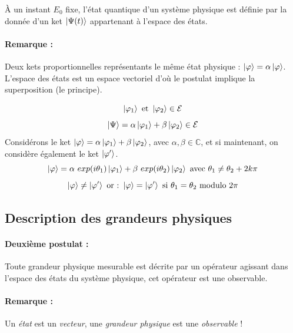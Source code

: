 \documentclass[12pt,a4paper,titlepage]{book}
\begin{document}
À un instant $E_0$ fixe, l'état quantique d'un système physique est définie par la donnée d'un ket $\ket{\Psi (t)}$ appartenant à l'espace des états.

\paragraph*{Remarque :}

Deux kets proportionnelles représentants le même état physique : $\ket \varphi = \alpha \ket \varphi$. L'espace des états est un espace vectoriel d'où le postulat implique la superposition (le principe).

\begin{equation*}
\ket{\varphi_1} \text{ et } \ket{\varphi_2} \in \mathcal{E}
\end{equation*}
\begin{equation*}
\ket \Psi = \alpha\ket{\varphi_1} + \beta\ket{\varphi_2} \in \mathcal{E}
\end{equation*}
Considérons le ket $\ket \varphi = \alpha\ket{\varphi_1} + \beta\ket{\varphi_2}$, avec $\alpha, \beta \in \mathbb{C}$, et si maintenant, on considère également le ket $\ket{\varphi'}$.
\begin{equation*}
\ket \varphi = \alpha ~exp(i \theta_1) \ket{\varphi_1} + \beta ~exp(i \theta_2)\ket{\varphi_2} ~\text{avec}~ \theta_1 \neq \theta_2 + 2k\pi
\end{equation*}
\begin{equation*}
\ket\varphi \neq \ket{\varphi'} ~\text{or :}~ \ket\varphi = \ket{\varphi'} ~\text{si}~ \theta_1 = \theta_2 \text{ modulo } 2\pi
\end{equation*}
\subsection{Description des grandeurs physiques}
\paragraph*{Deuxième postulat :}

Toute grandeur physique mesurable est décrite par un opérateur agissant dans l'espace des états du système physique, cet opérateur est une observable.

\paragraph*{Remarque :}

Un \textit{état} est un \textit{vecteur}, une \textit{grandeur physique} est une \textit{observable} !
\end{document}
